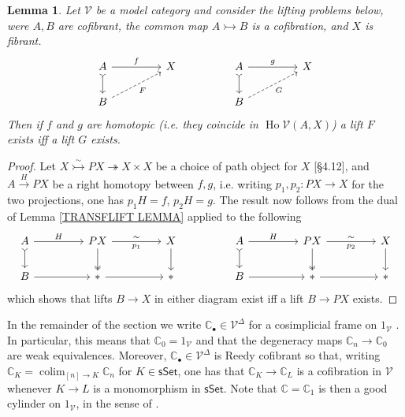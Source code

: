 \documentclass[a4paper,10pt
,draft
]{article}%
\numberwithin{equation}{section}
\numberwithin{figure}{section}
\newtheorem{lemma}[equation]{Lemma}%
\theoremstyle{definition} %
\DeclareMathOperator{\colim}{colim}%
\DeclareMathOperator{\Ho}{Ho}
\newcommand{\V}{\ensuremath{\mathcal V}}
\newcommand{\1}{\ensuremath{\mathbbm 1}}%
\begin{document}
\begin{lemma}\label{LIFTEQUIV LEM}
Let $\V$ be a model category and
consider the lifting problems below, were $A,B$ are cofibrant, 
the common map $A \rightarrowtail B$ is a cofibration, and $X$ is fibrant.
\begin{equation}
\begin{tikzcd}[column sep = 45pt]
	A
	\ar[rightarrowtail]{d}
	\arrow{r}{f}
&
	X
&%
	A
	\ar[rightarrowtail]{d}
	\arrow{r}{g}
&
	X
\\
	B \ar[dashed]{ru}[swap]{F}
&
&%
	B \ar[dashed]{ru}[swap]{G}
&
\end{tikzcd}
\end{equation}
Then if $f$ and $g$ are homotopic 
(i.e. they coincide in $\Ho \V(A,X)$)
a lift $F$ exists iff a lift $G$ exists.
\end{lemma}

\begin{proof}
Let 
$X \overset{\sim}{\rightarrowtail} PX 
\twoheadrightarrow X \times X$
be a choice of path object for $X$ \cite{DS95}[\S 4.12],
and $A \xrightarrow{H} PX$
be a right homotopy between $f,g$,
i.e. writing $p_1,p_2 \colon PX \to X$ for the two projections,
one has
$p_1H=f$, $p_2H=g$.
The result now follows from the dual of Lemma \ref{TRANSFLIFT LEMMA}
applied to the following
\begin{equation}
\begin{tikzcd}[column sep = 45pt]
	A
	\ar[rightarrowtail]{d}
	\arrow{r}{H}
&
	PX
	\arrow[twoheadrightarrow]{d} \ar{r}{\sim}[swap]{p_1}
&
	X \ar{d}
&%
	A
	\ar[rightarrowtail]{d}
	\arrow{r}{H}
&
	PX
	\arrow[twoheadrightarrow]{d} \ar{r}{\sim}[swap]{p_2}
&
	X \ar{d}
\\
	B
	\arrow{r}
&
	\**\ar{r}
&
	\**
&%
	B
	\arrow{r}
&
	\**\ar{r}
&
	\**
\end{tikzcd}
\end{equation}
which shows that lifts $B \to X$ in either diagram
exist iff a lift $B \to PX$ exists.
\end{proof}



In the remainder of the section we write
$\mathbb{C}_{\bullet} \in \V^{\Delta}$
for a cosimplicial frame on $1_{\V}$
\cite[Defn. 16.6.1]{Hir03}.
In particular, this means that 
$\mathbb{C}_0 = 1_{\V}$
and that the degeneracy maps
$\mathbb{C}_n \to \mathbb{C}_0$ 
are weak equivalences.
Moreover, $\mathbb{C}_{\bullet} \in \V^{\Delta}$ is Reedy cofibrant so that, writing
$\mathbb{C}_{K} = \colim_{[n] \to K} \mathbb{C}_n$
for $K \in \mathsf{sSet}$,
one has that 
$\mathbb{C}_{K} \to \mathbb{C}_{L}$
is a cofibration in $\V$
whenever $K\to L$ is a monomorphism in $\mathsf{sSet}$.
Note that $\mathbb{C} = \mathbb{C}_1$
is then a good cylinder on $1_{\V}$, in the sense of \cite[Defn. 4.2(i)]{DS95}.
\end{document}
